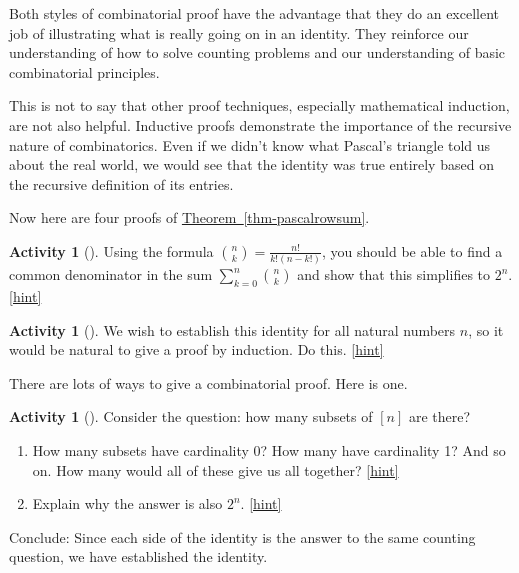 \documentclass[10pt,]{book}
\theoremstyle{plain}
\theoremstyle{definition}
\theoremstyle{definition}
\theoremstyle{definition}
\newtheorem{activity}[project]{Activity}
\numberwithin{equation}{chapter}
\begin{document}
\par
\hypertarget{p-571}{}%
Both styles of combinatorial proof have the advantage that they do an excellent job of illustrating what is really going on in an identity.  They reinforce our understanding of how to solve counting problems and our understanding of basic combinatorial principles.%
\par
\hypertarget{p-572}{}%
This is not to say that other proof techniques, especially mathematical induction, are not also helpful.  Inductive proofs demonstrate the importance of the recursive nature of combinatorics.  Even if we didn't know what Pascal's triangle told us about the real world, we would see that the identity was true entirely based on the recursive definition of its entries.%
\par
\hypertarget{p-573}{}%
Now here are four proofs of \hyperref[thm-pascalrowsum]{Theorem~\ref{thm-pascalrowsum}}.%
\begin{activity}[]\label{act-pascalrowsum-alg}
\hypertarget{p-574}{}%
Using the formula \(\binom{n}{k} = \frac{n!}{k!(n-k!)}\), you should be able to find a common denominator in the sum \(\sum_{k=0}^n \binom{n}{k}\) and show that this simplifies to \(2^n\).%
\hfill{\tiny\hyperlink{a-76}{[hint]}\hypertarget{q-76}{}}\end{activity}
\begin{activity}[]\label{activity-70}
\hypertarget{p-576}{}%
We wish to establish this identity for all natural numbers \(n\), so it would be natural to give a proof by induction.  Do this.%
\hfill{\tiny\hyperlink{a-77}{[hint]}\hypertarget{q-77}{}}\end{activity}
\hypertarget{p-578}{}%
There are lots of ways to give a combinatorial proof.  Here is one.%
\begin{activity}[]\label{activity-pascalrow-dc}
\hypertarget{p-579}{}%
Consider the question: how many subsets of \([n]\) are there?%
\begin{enumerate}[font=\bfseries,label=(\alph*),ref=\alph*]
\item\label{task-109} \hypertarget{p-580}{}%
How many subsets have cardinality 0?  How many have cardinality 1?  And so on.  How many would all of these give us all together?%
\hfill{\tiny\hyperlink{a-78.a}{[hint]}\hypertarget{q-78.a}{}}\item\label{task-110} \hypertarget{p-582}{}%
Explain why the answer is also \(2^n\).%
\hfill{\tiny\hyperlink{a-78.b}{[hint]}\hypertarget{q-78.b}{}}\end{enumerate}
\bigbreak
\hypertarget{p-584}{}%
Conclude: Since each side of the identity is the answer to the same counting question, we have established the identity.%
\end{activity}
\end{document}
